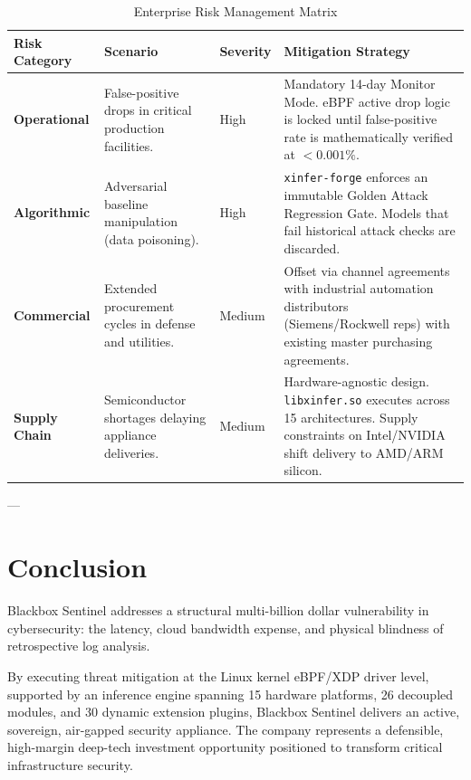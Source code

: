 \documentclass[11pt,a4paper]{article}
\begin{document}
\begin{table}[h]
\centering
\small
\caption{Enterprise Risk Management Matrix}
\label{tab:risk}
\vspace{0.2cm}
\begin{tabularx}{\textwidth}{lXXp{6cm}}
\toprule
\textbf{Risk Category} & \textbf{Scenario} & \textbf{Severity} & \textbf{Mitigation Strategy} \\ \midrule
\textbf{Operational} & False-positive drops in critical production facilities. & High & Mandatory 14-day Monitor Mode. eBPF active drop logic is locked until false-positive rate is mathematically verified at $<0.001\%$. \\
\textbf{Algorithmic} & Adversarial baseline manipulation (data poisoning). & High & \texttt{xinfer-forge} enforces an immutable Golden Attack Regression Gate. Models that fail historical attack checks are discarded. \\
\textbf{Commercial} & Extended procurement cycles in defense and utilities. & Medium & Offset via channel agreements with industrial automation distributors (Siemens/Rockwell reps) with existing master purchasing agreements. \\
\textbf{Supply Chain} & Semiconductor shortages delaying appliance deliveries. & Medium & Hardware-agnostic design. \texttt{libxinfer.so} executes across 15 architectures. Supply constraints on Intel/NVIDIA shift delivery to AMD/ARM silicon. \\ \bottomrule
\end{tabularx}
\end{table}

---

\section{Conclusion}
Blackbox Sentinel addresses a structural multi-billion dollar vulnerability in cybersecurity: the latency, cloud bandwidth expense, and physical blindness of retrospective log analysis. 

By executing threat mitigation at the Linux kernel eBPF/XDP driver level, supported by an inference engine spanning 15 hardware platforms, 26 decoupled modules, and 30 dynamic extension plugins, Blackbox Sentinel delivers an active, sovereign, air-gapped security appliance. The company represents a defensible, high-margin deep-tech investment opportunity positioned to transform critical infrastructure security.
\end{document}

